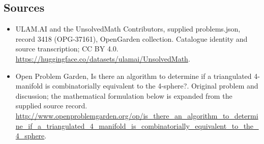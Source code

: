 \documentclass[11pt,a4paper]{article}
\begin{document}
\subsection{Sources}
\begin{itemize}
\item[S1] ULAM.AI and the UnsolvedMath Contributors, supplied problems.json, record 3418 (OPG-37161), OpenGarden collection. Catalogue identity and source transcription; CC BY 4.0.
\url{https://huggingface.co/datasets/ulamai/UnsolvedMath}.
\item[S2] Open Problem Garden, Is there an algorithm to determine if a triangulated 4-manifold is combinatorially equivalent to the 4-sphere?. Original problem and discussion; the mathematical formulation below is expanded from the supplied source record.
\url{http://www.openproblemgarden.org/op/is_there_an_algorithm_to_determine_if_a_triangulated_4_manifold_is_combinatorially_equivalent_to_the_4_sphere}.
\end{itemize}
\end{document}
